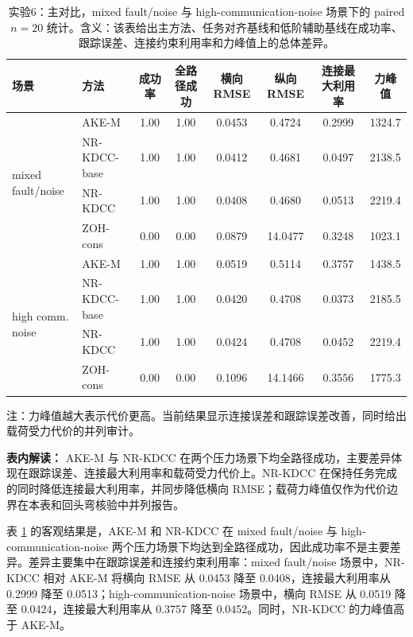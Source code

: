 \documentclass[twocolumn,3p,times,procedia]{elsarticle}
\newcommand{\AKE}{AKE-M}
\newcommand{\Method}{NR-KDCC}
\newcommand{\MethodBase}{NR-KDCC-base}
\newcommand{\ZOHcons}{ZOH-cons}
\newcommand{\TF}{\Method{}}
\begin{document}
\begin{table}[!t]
\centering
\caption{实验6：主对比，mixed fault/noise 与 high-communication-noise 场景下的 paired $n=20$ 统计。含义：该表给出主方法、任务对齐基线和低阶辅助基线在成功率、跟踪误差、连接约束利用率和力峰值上的总体差异。}
\label{tab:e0_main}
\footnotesize
\begin{tabular}{llcccccc}
\toprule
场景 & 方法 & 成功率 & 全路径成功 & 横向 RMSE & 纵向 RMSE & 连接最大利用率 & 力峰值 \\
\midrule
\multirow{4}{*}{mixed fault/noise}
& \AKE{} & 1.00 & 1.00 & 0.0453 & 0.4724 & 0.2999 & 1324.7\\
& \MethodBase{} & 1.00 & 1.00 & 0.0412 & 0.4681 & 0.0497 & 2138.5\\
& \TF{} & 1.00 & 1.00 & 0.0408 & 0.4680 & 0.0513 & 2219.4\\
& \ZOHcons{} & 0.00 & 0.00 & 0.0879 & 14.0477 & 0.3248 & 1023.1\\
\midrule
\multirow{4}{*}{high comm. noise}
& \AKE{} & 1.00 & 1.00 & 0.0519 & 0.5114 & 0.3757 & 1438.5\\
& \MethodBase{} & 1.00 & 1.00 & 0.0420 & 0.4708 & 0.0373 & 2185.5\\
& \TF{} & 1.00 & 1.00 & 0.0424 & 0.4708 & 0.0452 & 2219.4\\
& \ZOHcons{} & 0.00 & 0.00 & 0.1096 & 14.1466 & 0.3556 & 1775.3\\
\bottomrule
\end{tabular}
\begin{tablenotes}
\footnotesize
\item 注：力峰值越大表示代价更高。当前结果显示连接误差和跟踪误差改善，同时给出载荷受力代价的并列审计。
\end{tablenotes}
\vspace{1.5mm}
\begin{minipage}{0.93\textwidth}
\footnotesize
\textbf{表内解读：} \AKE{} 与 \Method{} 在两个压力场景下均全路径成功，主要差异体现在跟踪误差、连接最大利用率和载荷受力代价上。\Method{} 在保持任务完成的同时降低连接最大利用率，并同步降低横向 RMSE；载荷力峰值仅作为代价边界在本表和回头弯核验中并列报告。
\end{minipage}
\end{table}

表 \ref{tab:e0_main} 的客观结果是，\AKE{} 和 \Method{} 在 mixed fault/noise 与 high-communication-noise 两个压力场景下均达到全路径成功，因此成功率不是主要差异。差异主要集中在跟踪误差和连接约束利用率：mixed fault/noise 场景中，\Method{} 相对 \AKE{} 将横向 RMSE 从 0.0453 降至 0.0408，连接最大利用率从 0.2999 降至 0.0513；high-communication-noise 场景中，横向 RMSE 从 0.0519 降至 0.0424，连接最大利用率从 0.3757 降至 0.0452。同时，\Method{} 的力峰值高于 \AKE{}。
\end{document}
